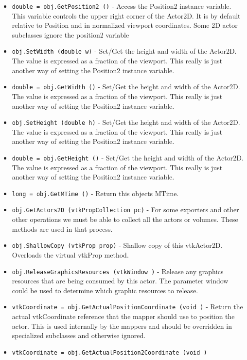 \begin{itemize}
\item  \verb|double = obj.GetPosition2 ()| -  Access the Position2 instance variable. This variable controls
 the upper right corner of the Actor2D. It is by default
 relative to Position and in normalized viewport coordinates.
 Some 2D actor subclasses ignore the position2 variable

\item  \verb|obj.SetWidth (double w)| -  Set/Get the height and width of the Actor2D. The value is expressed
 as a fraction of the viewport. This really is just another way of
 setting the Position2 instance variable.

\item  \verb|double = obj.GetWidth ()| -  Set/Get the height and width of the Actor2D. The value is expressed
 as a fraction of the viewport. This really is just another way of
 setting the Position2 instance variable.

\item  \verb|obj.SetHeight (double h)| -  Set/Get the height and width of the Actor2D. The value is expressed
 as a fraction of the viewport. This really is just another way of
 setting the Position2 instance variable.

\item  \verb|double = obj.GetHeight ()| -  Set/Get the height and width of the Actor2D. The value is expressed
 as a fraction of the viewport. This really is just another way of
 setting the Position2 instance variable.

\item  \verb|long = obj.GetMTime ()| -  Return this objects MTime.

\item  \verb|obj.GetActors2D (vtkPropCollection pc)| -  For some exporters and other other operations we must be
 able to collect all the actors or volumes. These methods
 are used in that process.

\item  \verb|obj.ShallowCopy (vtkProp prop)| -  Shallow copy of this vtkActor2D. Overloads the virtual vtkProp method.

\item  \verb|obj.ReleaseGraphicsResources (vtkWindow )| -  Release any graphics resources that are being consumed by this actor.
 The parameter window could be used to determine which graphic
 resources to release.

\item  \verb|vtkCoordinate = obj.GetActualPositionCoordinate (void )| -  Return the actual vtkCoordinate reference that the mapper should use
 to position the actor. This is used internally by the mappers and should
 be overridden in specialized subclasses and otherwise ignored.

\item  \verb|vtkCoordinate = obj.GetActualPosition2Coordinate (void )|

\end{itemize}
